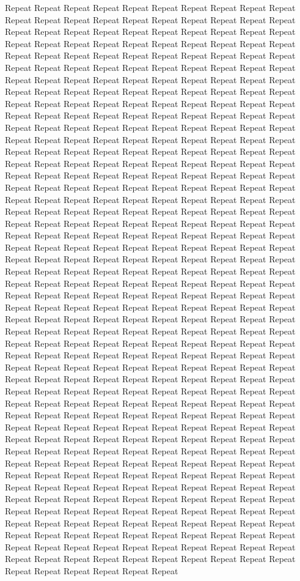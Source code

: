 \documentclass[lettersize,journal]{IEEEtran}
\begin{document}
Repeat Repeat Repeat Repeat Repeat Repeat Repeat Repeat Repeat Repeat Repeat Repeat Repeat Repeat Repeat Repeat Repeat Repeat Repeat Repeat Repeat Repeat Repeat Repeat Repeat Repeat Repeat Repeat Repeat Repeat Repeat Repeat Repeat Repeat Repeat Repeat Repeat Repeat Repeat Repeat Repeat Repeat Repeat Repeat Repeat Repeat Repeat Repeat Repeat Repeat Repeat Repeat Repeat Repeat Repeat Repeat Repeat Repeat Repeat Repeat Repeat Repeat Repeat Repeat Repeat Repeat Repeat Repeat Repeat Repeat Repeat Repeat Repeat Repeat Repeat Repeat Repeat Repeat Repeat Repeat Repeat Repeat Repeat Repeat Repeat Repeat Repeat Repeat Repeat Repeat Repeat Repeat Repeat Repeat Repeat Repeat Repeat Repeat Repeat Repeat Repeat Repeat Repeat Repeat Repeat Repeat Repeat Repeat Repeat Repeat Repeat Repeat Repeat Repeat Repeat Repeat Repeat Repeat Repeat Repeat Repeat Repeat Repeat Repeat Repeat Repeat Repeat Repeat Repeat Repeat Repeat Repeat Repeat Repeat Repeat Repeat Repeat Repeat Repeat Repeat Repeat Repeat Repeat Repeat Repeat Repeat Repeat Repeat Repeat Repeat Repeat Repeat Repeat Repeat Repeat Repeat Repeat Repeat Repeat Repeat Repeat Repeat Repeat Repeat Repeat Repeat Repeat Repeat Repeat Repeat Repeat Repeat Repeat Repeat Repeat Repeat Repeat Repeat Repeat Repeat Repeat Repeat Repeat Repeat Repeat Repeat Repeat Repeat Repeat Repeat Repeat Repeat Repeat Repeat Repeat Repeat Repeat Repeat Repeat Repeat Repeat Repeat Repeat Repeat Repeat Repeat Repeat Repeat Repeat Repeat Repeat Repeat Repeat Repeat Repeat Repeat Repeat Repeat Repeat Repeat Repeat Repeat Repeat Repeat Repeat Repeat Repeat Repeat Repeat Repeat Repeat Repeat Repeat Repeat Repeat Repeat Repeat Repeat Repeat Repeat Repeat Repeat Repeat Repeat Repeat Repeat Repeat Repeat Repeat Repeat Repeat Repeat Repeat Repeat Repeat Repeat Repeat Repeat Repeat Repeat Repeat Repeat Repeat Repeat Repeat Repeat Repeat Repeat Repeat Repeat Repeat Repeat Repeat Repeat Repeat Repeat Repeat Repeat Repeat Repeat Repeat Repeat Repeat Repeat Repeat Repeat Repeat Repeat Repeat Repeat Repeat Repeat Repeat Repeat Repeat Repeat Repeat Repeat Repeat Repeat Repeat Repeat Repeat Repeat Repeat Repeat Repeat Repeat Repeat Repeat Repeat Repeat Repeat Repeat Repeat Repeat Repeat Repeat Repeat Repeat Repeat Repeat Repeat Repeat Repeat Repeat Repeat Repeat Repeat Repeat Repeat Repeat Repeat Repeat Repeat Repeat Repeat Repeat Repeat Repeat Repeat Repeat Repeat Repeat Repeat Repeat Repeat Repeat Repeat Repeat Repeat Repeat Repeat Repeat Repeat Repeat Repeat Repeat Repeat Repeat Repeat Repeat Repeat Repeat Repeat Repeat Repeat Repeat Repeat Repeat Repeat Repeat Repeat Repeat Repeat Repeat Repeat Repeat Repeat Repeat Repeat Repeat Repeat Repeat Repeat Repeat Repeat Repeat Repeat Repeat Repeat Repeat Repeat Repeat Repeat Repeat Repeat Repeat Repeat Repeat Repeat Repeat Repeat Repeat Repeat Repeat Repeat Repeat Repeat Repeat Repeat Repeat Repeat Repeat Repeat Repeat Repeat Repeat Repeat Repeat Repeat Repeat Repeat Repeat Repeat Repeat Repeat Repeat Repeat Repeat Repeat Repeat Repeat Repeat Repeat Repeat Repeat Repeat Repeat Repeat Repeat Repeat Repeat Repeat Repeat Repeat Repeat Repeat Repeat Repeat Repeat Repeat Repeat Repeat Repeat Repeat Repeat Repeat Repeat Repeat Repeat Repeat Repeat Repeat Repeat Repeat Repeat Repeat Repeat Repeat Repeat Repeat Repeat Repeat Repeat Repeat 
\end{document}
